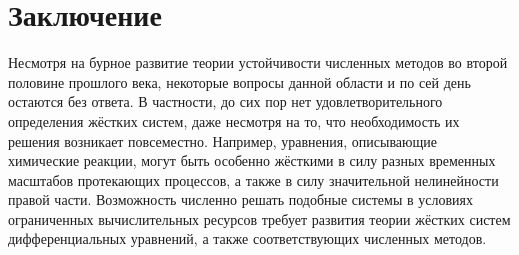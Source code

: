 \chapter{Заключение}
\label{chapter:summary} 

Несмотря на бурное развитие теории устойчивости численных методов во второй половине прошлого века,
некоторые вопросы данной области и по сей день остаются без ответа.
В частности, до сих пор нет удовлетворительного определения жёстких систем,
даже несмотря на то, что необходимость их решения возникает повсеместно.
Например, уравнения, описывающие химические реакции, могут быть особенно жёсткими в силу разных временных масштабов протекающих процессов,
а также в силу значительной нелинейности правой части.
Возможность численно решать подобные системы в условиях ограниченных вычислительных ресурсов
требует развития теории жёстких систем дифференциальных уравнений,
а также соответствующих численных методов.

